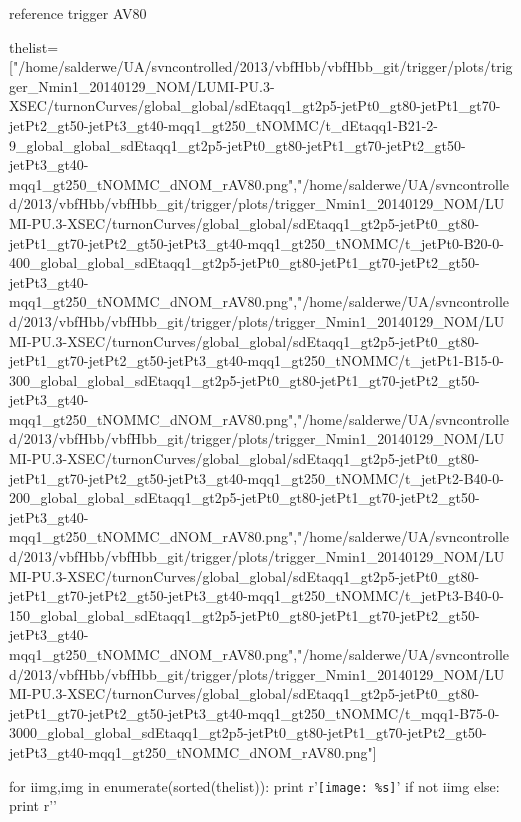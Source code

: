 \documentclass[12pt,english,dvipsnames]{beamer}
\begin{document}
\begin{frame}[t,fragile]{reference trigger AV80}
\begin{python}
thelist=["/home/salderwe/UA/svncontrolled/2013/vbfHbb/vbfHbb_git/trigger/plots/trigger_Nmin1_20140129_NOM/LUMI-PU.3-XSEC/turnonCurves/global_global/sdEtaqq1_gt2p5-jetPt0_gt80-jetPt1_gt70-jetPt2_gt50-jetPt3_gt40-mqq1_gt250_tNOMMC/t_dEtaqq1-B21-2-9_global_global_sdEtaqq1_gt2p5-jetPt0_gt80-jetPt1_gt70-jetPt2_gt50-jetPt3_gt40-mqq1_gt250_tNOMMC_dNOM_rAV80.png","/home/salderwe/UA/svncontrolled/2013/vbfHbb/vbfHbb_git/trigger/plots/trigger_Nmin1_20140129_NOM/LUMI-PU.3-XSEC/turnonCurves/global_global/sdEtaqq1_gt2p5-jetPt0_gt80-jetPt1_gt70-jetPt2_gt50-jetPt3_gt40-mqq1_gt250_tNOMMC/t_jetPt0-B20-0-400_global_global_sdEtaqq1_gt2p5-jetPt0_gt80-jetPt1_gt70-jetPt2_gt50-jetPt3_gt40-mqq1_gt250_tNOMMC_dNOM_rAV80.png","/home/salderwe/UA/svncontrolled/2013/vbfHbb/vbfHbb_git/trigger/plots/trigger_Nmin1_20140129_NOM/LUMI-PU.3-XSEC/turnonCurves/global_global/sdEtaqq1_gt2p5-jetPt0_gt80-jetPt1_gt70-jetPt2_gt50-jetPt3_gt40-mqq1_gt250_tNOMMC/t_jetPt1-B15-0-300_global_global_sdEtaqq1_gt2p5-jetPt0_gt80-jetPt1_gt70-jetPt2_gt50-jetPt3_gt40-mqq1_gt250_tNOMMC_dNOM_rAV80.png","/home/salderwe/UA/svncontrolled/2013/vbfHbb/vbfHbb_git/trigger/plots/trigger_Nmin1_20140129_NOM/LUMI-PU.3-XSEC/turnonCurves/global_global/sdEtaqq1_gt2p5-jetPt0_gt80-jetPt1_gt70-jetPt2_gt50-jetPt3_gt40-mqq1_gt250_tNOMMC/t_jetPt2-B40-0-200_global_global_sdEtaqq1_gt2p5-jetPt0_gt80-jetPt1_gt70-jetPt2_gt50-jetPt3_gt40-mqq1_gt250_tNOMMC_dNOM_rAV80.png","/home/salderwe/UA/svncontrolled/2013/vbfHbb/vbfHbb_git/trigger/plots/trigger_Nmin1_20140129_NOM/LUMI-PU.3-XSEC/turnonCurves/global_global/sdEtaqq1_gt2p5-jetPt0_gt80-jetPt1_gt70-jetPt2_gt50-jetPt3_gt40-mqq1_gt250_tNOMMC/t_jetPt3-B40-0-150_global_global_sdEtaqq1_gt2p5-jetPt0_gt80-jetPt1_gt70-jetPt2_gt50-jetPt3_gt40-mqq1_gt250_tNOMMC_dNOM_rAV80.png","/home/salderwe/UA/svncontrolled/2013/vbfHbb/vbfHbb_git/trigger/plots/trigger_Nmin1_20140129_NOM/LUMI-PU.3-XSEC/turnonCurves/global_global/sdEtaqq1_gt2p5-jetPt0_gt80-jetPt1_gt70-jetPt2_gt50-jetPt3_gt40-mqq1_gt250_tNOMMC/t_mqq1-B75-0-3000_global_global_sdEtaqq1_gt2p5-jetPt0_gt80-jetPt1_gt70-jetPt2_gt50-jetPt3_gt40-mqq1_gt250_tNOMMC_dNOM_rAV80.png"]

for iimg,img in enumerate(sorted(thelist)):
  print r'\texttt{[image: \%s]}'%
  if not iimg%
  else: print r'\newline'
  
\end{python}
\end{frame}
\end{document}
